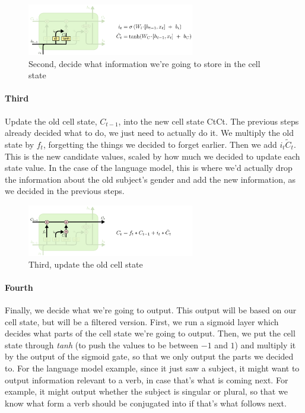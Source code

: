 \documentclass{article}
\begin{document}
	\begin{figure}[h]
		\centering
		\includegraphics[width=0.65\textwidth]{Images/recurrent_neural_networks/21.png}
		\caption{Second, decide what information we’re going to store in the cell state}
	\end{figure}
	
	\paragraph*{Third} Update the old cell state, $C_{t-1}$, into the new cell state CtCt. The previous steps already decided what to do, we just need to actually do it. We multiply the old state by $f_t$, forgetting the things we decided to forget earlier. Then we add $i_t \widetilde{C}_t$. This is the new candidate values, scaled by how much we decided to update each state value. In the case of the language model, this is where we’d actually drop the information about the old subject’s gender and add the new information, as we decided in the previous steps.
	
	\begin{figure}[h]
		\centering
		\includegraphics[width=0.65\textwidth]{Images/recurrent_neural_networks/22.png}
		\caption{Third, update the old cell state}
	\end{figure}
	
	\paragraph*{Fourth} Finally, we decide what we’re going to output. This output will be based on our cell state, but will be a filtered version. First, we run a sigmoid layer which decides what parts of the cell state we’re going to output. Then, we put the cell state through \textit{tanh} (to push the values to be between $-1$ and $1$) and multiply it by the output of the sigmoid gate, so that we only output the parts we decided to. For the language model example, since it just saw a subject, it might want to output information relevant to a verb, in case that’s what is coming next. For example, it might output whether the subject is singular or plural, so that we know what form a verb should be conjugated into if that’s what follows next.
	
\end{document}
